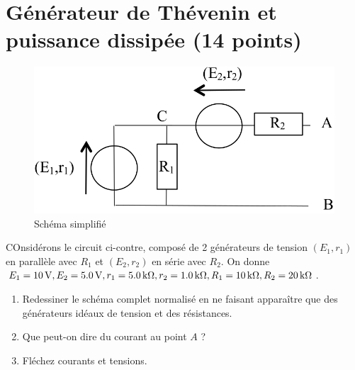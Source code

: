 \documentclass[10pt,a4paper]{article}
\begin{document}
\newpage

\section{Générateur de Thévenin et puissance dissipée (14 points)}
\begin{figure}
    \vspace*{-25pt}
    \raggedleft
    \includegraphics[width=\linewidth]{th_solo.png}
    \captionsetup{justification=centering}
    \caption{Schéma simplifié}
    \label{fig:solo}
\end{figure}
COnsidérons le circuit ci-contre, composé de 2 générateurs de tension 
$(E_1, r_1)$ en parallèle avec $R_1$ et $(E_2, r_2)$ en série avec $R_2$. On
donne $E_1 = \SI{10}{V}, E_2 = \SI{5.0}{V}, r_1= \SI{5.0}{k\Omega}, r_2 =
\SI{1.0}{k\Omega}, R_1 = \SI{10}{k\Omega}, R_2 = \SI{20}{k\Omega}$.

\begin{enumerate}[label=\color{brandeisblue}\arabic*)]
    \item Redessiner le schéma complet normalisé en ne faisant apparaître que
        des générateurs idéaux de tension et des résistances.
        \vspace{3cm}
    \item Que peut-on dire du courant au point $A$ ?
        \vspace{1cm}
    \item Fléchez courants et tensions.
\end{enumerate}
\end{document}
